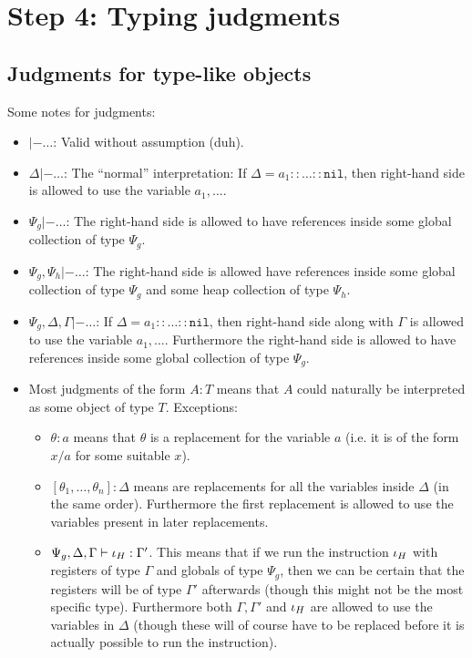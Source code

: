 \section{Step 4: Typing judgments}
\subsection{Judgments for type-like objects}

Some notes for judgments:

\begin{itemize}
\item $|- \dots$: Valid without assumption (duh).
\item $\Delta |- \dots$: The ``normal'' interpretation: If
  $\Delta = a_1 :: \dots :: \mathtt{nil}$, then right-hand side is allowed to
  use the variable $a_1, \dots$.
\item $\Psi_g |- \dots$: The right-hand side is allowed to have references
  inside some global collection of type $\Psi_g$.
\item $\Psi_g, \Psi_h |- \dots$: The right-hand side is allowed have references
  inside some global collection of type $\Psi_g$ and some heap collection of
  type $\Psi_h$.
\item $\Psi_g, \Delta, \Gamma |- \dots$: If
  $\Delta = a_1 :: \dots :: \mathtt{nil}$, then right-hand side along with
  $\Gamma$ is allowed to use the variable $a_1, \dots$. Furthermore the
  right-hand side is allowed to have references inside some global collection of
  type $\Psi_g$.
\item Most judgments of the form $A : T$ means that $A$ could naturally be
  interpreted as some object of type $T$. Exceptions:
  \begin{itemize}
  \item $\theta : a$ means that $\theta$ is a replacement for the variable $a$
    (i.e. it is of the form $x / a$ for some suitable $x$).
  \item $[\theta_1, \dots, \theta_n] : \Delta$ means are replacements for all
    the variables inside $\Delta$ (in the same order). Furthermore the first
    replacement is allowed to use the variables present in later replacements.
  \item $\Psi_g, \Delta, \Gamma |- {\iota_H} : \Gamma'$. This means that if
    we run the instruction ${\iota_H}$ with registers of type $\Gamma$ and
    globals of type $\Psi_g$, then we can be certain that the registers will be
    of type $\Gamma'$ afterwards (though this might not be the most specific
    type). Furthermore both $\Gamma, \Gamma'$ and ${\iota_H}$ are allowed to
    use the variables in $\Delta$ (though these will of course have to be
    replaced before it is actually possible to run the instruction).
  \end{itemize}
\end{itemize}

